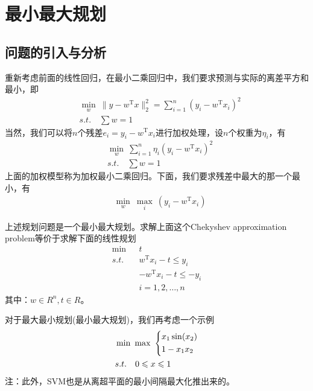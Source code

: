 
\chapter{最小最大规划}

\section{问题的引入与分析}
    \par
    重新考虑前面的线性回归，在最小二乘回归中，我们要求预测与实际的离差平方和最小，即
    \begin{align*}
        &\mathop{\min}\limits_{w}\ \|y-w^\mathrm{T} x\|_2^2=\mathop{\sum}\limits_{i=1}^n(y_i-w^\mathrm{T} x_i)^2\\
        &s.t.\quad {\sum}w=1
    \end{align*}
    当然，我们可以将$n$个残差$e_i=y_i-w^\mathrm{T} x_i$进行加权处理，设$n$个权重为${\eta}_i$，有
    \begin{align*}
        &\mathop{\min}\limits_{w}\  \mathop{\sum}\limits_{i=1}^n{\eta}_i(y_i-w^\mathrm{T} x_i)^2\\
        &s.t.\quad {\sum}w=1
    \end{align*}
    上面的加权模型称为加权最小二乘回归。下面，我们要求残差中最大的那一个最小，有
    \begin{align*}
        &\mathop{\min}\limits_{w}\  \mathop{\max}\limits_{i}\ (y_i-w^\mathrm{T} x_i)
    \end{align*}
    \par
    上述规划问题是一个最小最大规划。求解上面这个Chekyshev approximation problem等价于求解下面的线性规划
    \begin{align*}
        \mathop{\min}\  &t\\
        s.t.\quad & w^\mathrm{T} x_i-t\leqslant y_i\\
        & -w^\mathrm{T} x_i-t\leqslant -y_i\\
        &i=1,2,\ldots,n
    \end{align*}
    其中：$w\in R^n,t\in R$。
    \par
    对于最大最小规划(最小最大规划)，我们再考虑一个示例
        \begin{align}
        \label{引例2}
        &\mathop {\min} \ \mathop {\max}\
        \left\{
        \begin{aligned}
        & x_1\sin(x_2)\\
        & 1-x_1x_2\\
        \end{aligned}
        \right.\\
        &s.t.\quad 0 \leqslant x \leqslant 1 \notag
        \end{align}
        注：此外，SVM也是从离超平面的最小间隔最大化推出来的。

